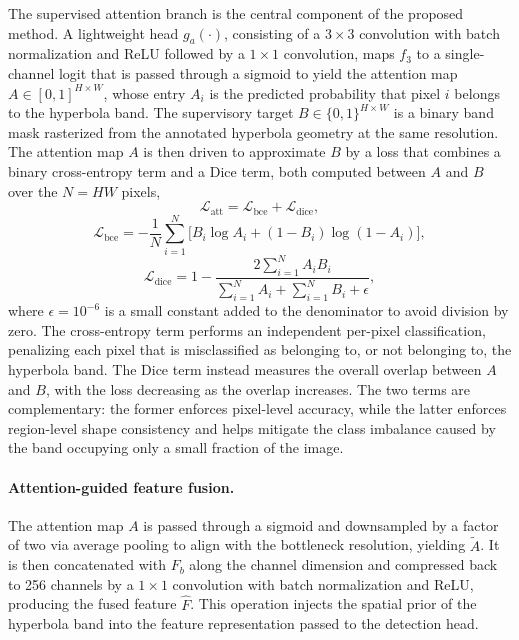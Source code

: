 \documentclass[lettersize,journal]{IEEEtran}
\begin{document}
The supervised attention branch is the central component of the proposed method. 
A lightweight head $g_a(\cdot)$, consisting of a $3\times3$ convolution with batch normalization 
and ReLU followed by a $1\times1$ convolution, maps $f_3$ to a single-channel logit 
that is passed through a sigmoid to yield the attention map $A\in[0,1]^{H\times W}$,
whose entry $A_i$ is the predicted probability that pixel $i$ belongs to the hyperbola band.
The supervisory target $B\in\{0,1\}^{H\times W}$ is a binary band mask rasterized from the annotated hyperbola geometry at the same resolution.
The attention map $A$ is then driven to approximate $B$ by a loss that combines a binary cross-entropy term and a Dice term, both computed between $A$ and $B$ over the $N=HW$ pixels,
\begin{equation}
\mathcal{L}_{\mathrm{att}} = \mathcal{L}_{\mathrm{bce}} + \mathcal{L}_{\mathrm{dice}},
\end{equation}
\begin{equation}
\mathcal{L}_{\mathrm{bce}} = -\frac{1}{N}\sum_{i=1}^{N}\Big[B_i\log A_i + (1-B_i)\log(1-A_i)\Big],
\end{equation}
\begin{equation}
\mathcal{L}_{\mathrm{dice}} = 1 - \frac{2\sum_{i=1}^{N} A_i B_i}{\sum_{i=1}^{N} A_i + \sum_{i=1}^{N} B_i + \epsilon},
\end{equation}
where $\epsilon=10^{-6}$ is a small constant added to the denominator to avoid division by zero.
The cross-entropy term performs an independent per-pixel classification, penalizing each pixel that is misclassified as belonging to, or not belonging to, the hyperbola band.
The Dice term instead measures the overall overlap between $A$ and $B$, with the loss decreasing as the overlap increases.
The two terms are complementary: the former enforces pixel-level accuracy, 
while the latter enforces region-level shape consistency 
and helps mitigate the class imbalance caused by the band occupying only a small fraction of the image.

\paragraph{Attention-guided feature fusion.}
The attention map $A$ is passed through a sigmoid and downsampled by a factor of two via average pooling 
to align with the bottleneck resolution, yielding $\tilde{A}$. 
It is then concatenated with $F_b$ along the channel dimension 
and compressed back to 256 channels by a $1\times1$ convolution with batch normalization and ReLU, 
producing the fused feature $\hat{F}$. 
This operation injects the spatial prior of the hyperbola band into the feature representation passed to the detection head.
\end{document}
